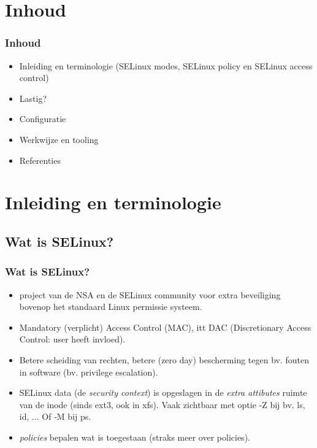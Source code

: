\section{Inhoud}

\begin{frame}
	\frametitle{Inhoud}
\begin{itemize}
\item Inleiding en terminologie (SELinux modes, SELinux policy en SELinux access control)
\item Lastig?
\item Configuratie
\item Werkwijze en tooling
\item Referenties
\end{itemize}
\end{frame}

\section{Inleiding en terminologie}
\subsection{Wat is SELinux?}
\begin{frame}
	\frametitle{Wat is SELinux?}
\begin{itemize}
\pause
\item project van de NSA en de SELinux community voor extra beveiliging bovenop het standaard Linux permissie systeem.
\pause
\item Mandatory (verplicht) Access Control (MAC), itt DAC (Discretionary Access Control: user heeft invloed).
\pause
\item Betere scheiding van rechten, betere (zero day) bescherming tegen bv. fouten in software (bv. privilege escalation).
\pause
\item SELinux data (de {\it security context}) is opgeslagen in de {\it extra attibutes} ruimte van de inode (sinds ext3, ook in xfs). Vaak zichtbaar met optie -Z bij bv. ls, id, ... Of -M bij ps.
\pause
\item {\it policies} bepalen wat is toegestaan (straks meer over policies).
\end{itemize}
\end{frame}

